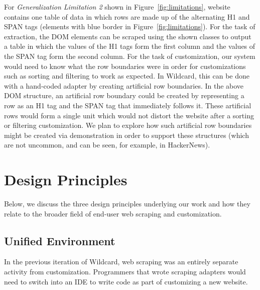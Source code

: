 \documentclass[sigconf,10pt]{acmart}
\begin{document}
For \emph{Generalization Limitation 2} shown in
Figure~\ref{fig:limitations}, website contains one table of data in
which rows are made up of the alternating H1 and SPAN tags (elements
with blue border in Figure~\ref{fig:limitations}). For the task of
extraction, the DOM elements can be scraped using the shown classes to
output a table in which the values of the H1 tags form the first column
and the values of the SPAN tag form the second column. For the task of
customization, our system would need to know what the row boundaries
were in order for customizations such as sorting and filtering to work
as expected. In Wildcard, this can be done with a hand-coded adapter by
creating artificial row boundaries. In the above DOM structure, an
artificial row boundary could be created by representing a row as an H1
tag and the SPAN tag that immediately follows it. These artificial rows
would form a single unit which would not distort the website after a
sorting or filtering customization. We plan to explore how such
artificial row boundaries might be created via demonstration in order to
support these structures (which are not uncommon, and can be seen, for
example, in HackerNews).

\hypertarget{sec:design-principles}{%
\section{Design Principles}\label{sec:design-principles}}

Below, we discuss the three design principles underlying our work and
how they relate to the broader field of end-user web scraping and
customization.

\hypertarget{unified-environment}{%
\subsection{Unified Environment}\label{unified-environment}}

In the previous iteration of Wildcard, web scraping was an entirely
separate activity from customization. Programmers that wrote scraping
adapters would need to switch into an IDE to write code as part of
customizing a new website.
\end{document}
